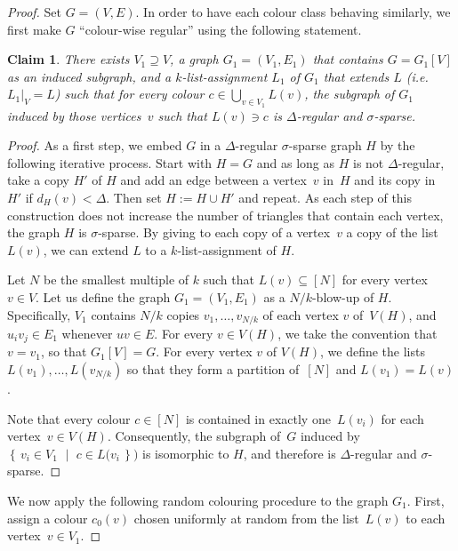 \documentclass[11pt]{article}
\theoremstyle{plain}
\newcounter{claimcount}
\newtheorem{claim}[claimcount]{Claim}
\newcommand{\resetclaimcount}{\setcounter{claimcount}{0}}
\newcommand{\sst}[2]{\left\{\,#1 \,\,\middle|\,\, #2\,\right\}}
\begin{document}
\begin{proof}
  \resetclaimcount
  Set $G=(V,E)$.
In order to have each colour class behaving similarly, we first make $G$ ``colour-wise regular''
using the following statement.
\begin{claim}\label{claim:colour regular}
  There exists $V_1\supseteq V$, a graph $G_1=(V_1,E_1)$ that contains $G=G_1[V]$ as an induced subgraph,
  and a $k$-list-assignment $L_1$ of $G_1$ that extends $L$ (i.e.~$L_1|_{V}=L$)
  such that for every colour $c\in \bigcup_{v\in V_1}L(v)$,
  the subgraph of $G_1$ induced by those vertices~$v$ such that $L(v) \ni c$
  is $\Delta$-regular and $\sigma$-sparse.
\end{claim}
\begin{proof}
  As a first step,
  we embed $G$ in a $\Delta$-regular $\sigma$-sparse graph $H$ by the following iterative process.
  Start with $H=G$ and as long as $H$ is not $\Delta$-regular, take a copy $H'$ of $H$
  and add an edge between a vertex~$v$ in~$H$ and its copy in~$H'$ if $d_H(v)<\Delta$.
  Then set $H:=H\cup H'$ and repeat.
  As each step of this construction does not increase the number of triangles that contain
  each vertex, the graph $H$ is $\sigma$-sparse.
  By giving to each copy of a vertex~$v$ a copy of the list $L(v)$, we can extend $L$ to a $k$-list-assignment of $H$.
  
  Let $N$ be the smallest multiple of $k$ such that $L(v) \subseteq [N]$ for every vertex
  $v \in V$.
  Let us define the graph $G_1=(V_1,E_1)$ as a $N/k$-blow-up of $H$.
  Specifically, $V_1$ contains $N/k$ copies $v_1,\dots,v_{N/k}$
  of each vertex $v$ of~$V(H)$,
  and $u_iv_j\in E_1$ whenever $uv\in E$.
  For every $v\in V(H)$, we take the convention that $v=v_1$, so that $G_1[V]=G$.
  For every vertex $v$ of $V(H)$,
  we define the lists $L(v_1),\dots,L(v_{N/k})$ so that they form a partition of~$[N]$
  and $L(v_1)=L(v)$.

  Note that every colour $c\in[N]$ is contained in exactly one~$L(v_i)$ for each vertex~$v\in V(H)$.
  Consequently, the subgraph of~$G$
  induced by $\sst{v_i\in V_1}{ c\in L(v_i})$ is isomorphic to $H$,
  and therefore is $\Delta$-regular and $\sigma$-sparse.
\end{proof}
We now apply the following random colouring procedure to the graph $G_1$.
First, assign a colour $c_0(v)$ chosen uniformly at random from
the list~$L(v)$ to each vertex~$v\in V_1$.


\end{proof}
\end{document}
